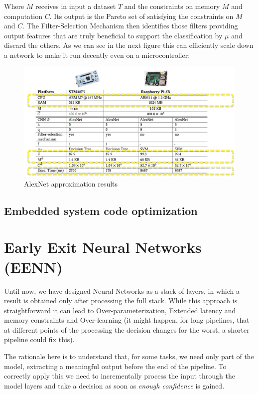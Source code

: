 \documentclass{article}
\begin{document}
      Where $M$ receives in input a dataset $T$ and the constraints on memory $M$ and computation $C$. Its output is the Pareto set of satisfying the constraints on $M$ and $C$.
      The Filter-Selection Mechanism then identifies those filters providing output features that are truly beneficial to support the classification by $\mu$ and discard the others.
      As we can see in the next figure this can efficiently scale down a network to make it run decently even on a microcontroller:
      \begin{figure}[H]
        \includegraphics[scale=0.35]{../Images/OptResults.png}
        \centering
        \caption{AlexNet approximation results}
      \end{figure}
        


    \subsection{Embedded system code optimization}

  \section{Early Exit Neural Networks (EENN)}
    Until now, we have designed Neural Networks as a stack of layers, in which a result is obtained only after processing the full stack. While this approach is straightforward it can lead to Over-parameterization, Extended latency and memory constraints and
    Over-learning (it might happen, for long pipelines, that at different points of the processing the decision changes for the worst, a shorter pipeline could fix this).

    The rationale here is to understand that, for some tasks, we need only part of the model, extracting a meaningful output before the end of the pipeline. To correctly apply this we need to incrementally process the input through the model layers and take a
    decision as soon as \emph{enough confidence} is gained.
\end{document}
